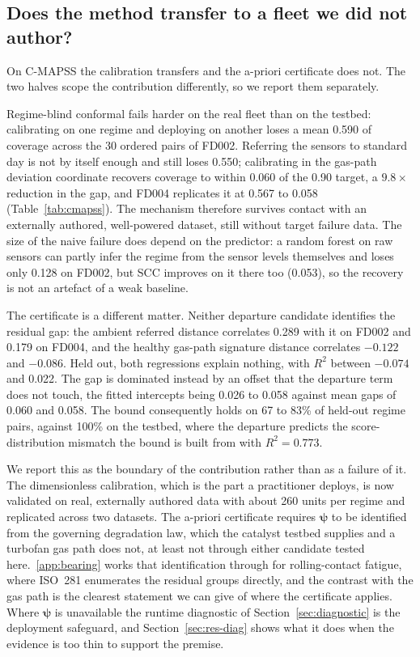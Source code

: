 \documentclass[review,times]{elsarticle}
\theoremstyle{definition}
\theoremstyle{remark}
\begin{document}
\subsection{Does the method transfer to a fleet we did not author?}\label{sec:res-cmapss}
On C-MAPSS the calibration transfers and the a-priori certificate does not. The two halves scope the
contribution differently, so we report them separately.

Regime-blind conformal fails harder on the real fleet than on the testbed: calibrating on one regime
and deploying on another loses a mean 0.590 of coverage across the 30 ordered pairs of FD002.
Referring the sensors to standard day is not by itself enough and still loses 0.550; calibrating in
the gas-path deviation coordinate recovers coverage to within 0.060 of the 0.90 target, a
$9.8\times$ reduction in the gap, and FD004 replicates it at 0.567 to 0.058
(Table~\ref{tab:cmapss}). The mechanism therefore survives contact with an externally authored,
well-powered dataset, still without target failure data. The size of the naive failure does depend
on the predictor: a random forest on raw sensors can partly infer the regime from the sensor levels
themselves and loses only 0.128 on FD002, but SCC improves on it there too (0.053), so the recovery
is not an artefact of a weak baseline.

The certificate is a different matter. Neither departure candidate identifies the residual gap: the
ambient referred distance correlates 0.289 with it on FD002 and 0.179 on FD004, and the healthy
gas-path signature distance correlates $-0.122$ and $-0.086$. Held out, both regressions explain
nothing, with $R^2$ between $-0.074$ and 0.022. The gap is dominated instead by an offset that the
departure term does not touch, the fitted intercepts being 0.026 to 0.058 against mean gaps of 0.060
and 0.058. The bound consequently holds on 67 to 83\% of held-out regime pairs, against 100\% on the
testbed, where the departure predicts the score-distribution mismatch the bound is built from with
$R^2=0.773$.

We report this as the boundary of the contribution rather than as a failure of it. The dimensionless
calibration, which is the part a practitioner deploys, is now validated on real, externally authored
data with about 260 units per regime and replicated across two datasets. The a-priori certificate
requires $\boldsymbol\psi$ to be identified from the governing degradation law, which the catalyst
testbed supplies and a turbofan gas path does not, at least not through either candidate tested
here.~\ref{app:bearing} works that identification through for rolling-contact fatigue, where
ISO~281 enumerates the residual groups directly, and the contrast with the gas path is the clearest
statement we can give of where the certificate applies. Where $\boldsymbol\psi$ is unavailable the
runtime diagnostic of Section~\ref{sec:diagnostic} is the deployment safeguard, and
Section~\ref{sec:res-diag} shows what it does when the evidence is too thin to support the
premise.
\end{document}
